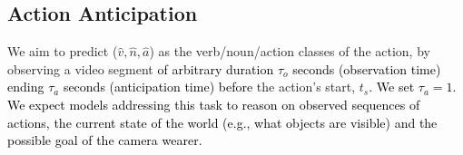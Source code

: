 \documentclass[twocolumn]{svjour3}          \smartqed
\newcommand{\chParagraph}[1]{\noindent {\textbf{#1.}} \hspace{6pt}}
\newcommand{\edits}[1]{\textcolor{black}{#1}}
\begin{document}
\begin{table*}[t!]
\caption{Action anticipation results reported in class-mean top-5 recall (\%).}
\label{tab:aa_results}
\end{table*}

\subsection{Action Anticipation}
\label{sec:action_anticipation_challenge}
\chParagraph{Definition}  
We aim to predict ($\hat{v},\hat{n},\hat{a}$) as the verb/noun/action classes of the action, by observing a video segment \edits{of arbitrary duration $\tau_o$ seconds (observation time) ending $\tau_a$ seconds (anticipation time) before} the action's start, $t_s$\edits{. We set $\tau_a=1$.}
\edits{We expect models addressing this task to reason on observed sequences of actions, the current state of the world (e.g., what objects are visible) and the possible goal of the camera wearer.}
\end{document}
